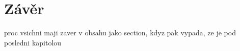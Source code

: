 \documentclass{template/socthesis}
\begin{document}
\newpage
\chapter*{Závěr}
proc vsichni maji zaver v obsahu jako section, kdyz pak vypada, ze je pod posledni kapitolou

\newpage
\printbibliography[title=Literatura]

\listoffigures
{}

\listoftables
{}
%
\end{document}
